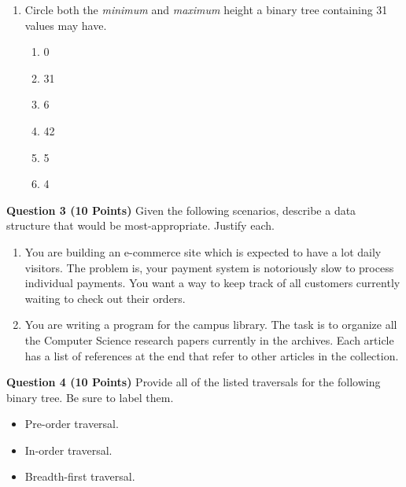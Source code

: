 \documentclass{letter}
\begin{document}
\begin{enumerate}[a]
\item Circle both the {\em minimum} and {\em maximum} height a binary tree
containing 31 values may have.

\begin{enumerate}[i]

\item 0
\item 31
\item 6
\item 42
\item 5
\item 4

\end{enumerate}

\end{enumerate}

\clearpage

{\bf Question 3 (10 Points)} \kern 0.5cm Given the following scenarios,
describe a data structure that would be most-appropriate.  Justify each.

\begin{enumerate}[a]

\item You are building an e-commerce site which is expected to have a lot daily
visitors.  The problem is, your payment system is notoriously slow to process
individual payments.  You want a way to keep track of all customers currently
waiting to check out their orders.

\vspace{8cm}

\item You are writing a program for the campus library.  The task is to
organize all the Computer Science research papers currently in the archives.
Each article has a list of references at the end that refer to other articles
in the collection.

\end{enumerate}

\clearpage

{\bf Question 4 (10 Points)} \kern 0.5cm Provide all of the listed traversals for
the following binary tree.  Be sure to label them.

\begin{itemize}
\item Pre-order traversal.
\item In-order traversal.
\item Breadth-first traversal.
\end{itemize}
\end{document}
